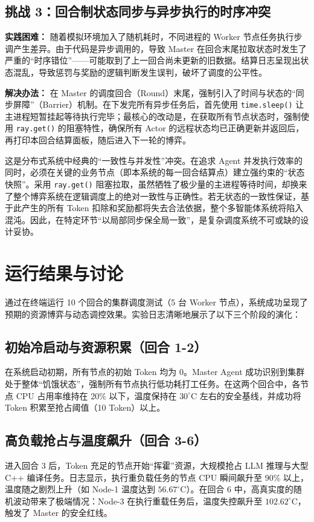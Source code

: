 \documentclass[11pt,a4paper]{ctexart}
\begin{document}
\subsection{挑战 3：回合制状态同步与异步执行的时序冲突}
\textbf{实践困难：} 随着模拟环境加入了随机耗时，不同进程的 Worker 节点任务执行步调产生差异。由于代码是异步调用的，导致 Master 在回合末尾拉取状态时发生了严重的“时序错位”——可能取到了上一回合尚未更新的旧数据。结算日志呈现出状态混乱，导致惩罚与奖励的逻辑判断发生误判，破坏了调度的公平性。

\textbf{解决办法：} 在 Master 的调度回合（Round）末尾，强制引入了时间与状态的“同步屏障”（Barrier）机制。在下发完所有异步任务后，首先使用 \texttt{time.sleep()} 让主进程短暂挂起等待执行完毕；最核心的改动是，在获取所有节点状态时，强制使用 \texttt{ray.get()} 的阻塞特性，确保所有 Actor 的远程状态均已正确更新并返回后，再打印本回合结算面板，随后进入下一轮的博弈。

\begin{tcolorbox}[reflectionbox]
这是分布式系统中经典的“一致性与并发性”冲突。在追求 Agent 并发执行效率的同时，必须在关键的业务节点（即本系统的每一回合结算点）建立强约束的“状态快照”。采用 \texttt{ray.get()} 阻塞拉取，虽然牺牲了极少量的主进程等待时间，却换来了整个博弈系统在逻辑调度上的绝对一致性与正确性。若无状态的一致性保证，基于此产生的所有 Token 扣除和奖励都将失去合法依据，整个多智能体系统将陷入混沌。因此，在特定环节“以局部同步保全局一致”，是复杂调度系统不可或缺的设计妥协。
\end{tcolorbox}

\section{运行结果与讨论}
通过在终端运行 10 个回合的集群调度测试（5 台 Worker 节点），系统成功呈现了预期的资源博弈与动态调控效果。实验日志清晰地展示了以下三个阶段的演化：

\subsection{初始冷启动与资源积累（回合 1-2）}
在系统启动初期，所有节点的初始 Token 均为 0。Master Agent 成功识别到集群处于整体“饥饿状态”，强制所有节点执行低功耗打工任务。在这两个回合中，各节点 CPU 占用率维持在 20\% 以下，温度保持在 $30^\circ\text{C}$ 左右的安全基线，并成功将 Token 积累至抢占阈值（10 Token）以上。

\subsection{高负载抢占与温度飙升（回合 3-6）}
进入回合 3 后，Token 充足的节点开始“挥霍”资源，大规模抢占 LLM 推理与大型 C++ 编译任务。日志显示，执行重负载任务的节点 CPU 瞬间飙升至 90\% 以上，温度随之剧烈上升（如 Node-1 温度达到 $56.67^\circ\text{C}$）。在回合 6 中，高真实度的随机波动带来了极端情况：Node-3 在执行重载任务后，温度失控飙升至 $102.62^\circ\text{C}$，触发了 Master 的安全红线。
\end{document}
